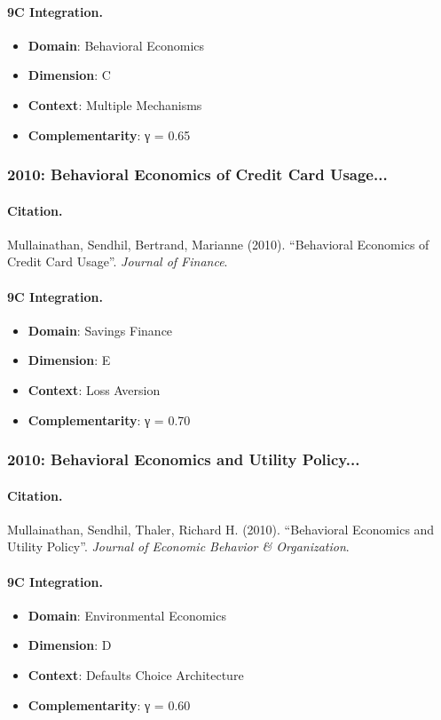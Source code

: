 \paragraph{9C Integration.}
\begin{itemize}[nosep]
  \item \textbf{Domain}: Behavioral Economics
  \item \textbf{Dimension}: C
  \item \textbf{Context}: Multiple Mechanisms
  \item \textbf{Complementarity}: γ = 0.65
\end{itemize}


\subsubsection{2010: Behavioral Economics of Credit Card Usage...}

\paragraph{Citation.}
Mullainathan, Sendhil, Bertrand, Marianne (2010). ``Behavioral Economics of Credit Card Usage''. \textit{Journal of Finance}.

\paragraph{9C Integration.}
\begin{itemize}[nosep]
  \item \textbf{Domain}: Savings Finance
  \item \textbf{Dimension}: E
  \item \textbf{Context}: Loss Aversion
  \item \textbf{Complementarity}: γ = 0.70
\end{itemize}


\subsubsection{2010: Behavioral Economics and Utility Policy...}

\paragraph{Citation.}
Mullainathan, Sendhil, Thaler, Richard H. (2010). ``Behavioral Economics and Utility Policy''. \textit{Journal of Economic Behavior & Organization}.

\paragraph{9C Integration.}
\begin{itemize}[nosep]
  \item \textbf{Domain}: Environmental Economics
  \item \textbf{Dimension}: D
  \item \textbf{Context}: Defaults Choice Architecture
  \item \textbf{Complementarity}: γ = 0.60
\end{itemize}


